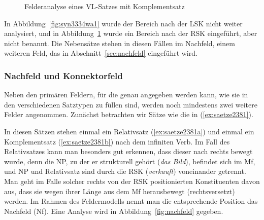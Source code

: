 \begin{figure}[!h]
  \centering
  \caption{Felderanalyse eines VL-Satzes mit Komplementsatz}
  \label{fig:syn3334wb2}
\end{figure}

In Abbildung~\ref{fig:syn3334wa1} wurde der Bereich nach der LSK nicht weiter analysiert, und in Abbildung~\ref{fig:syn3334wb2} wurde ein Bereich nach der RSK eingeführt, aber nicht benannt.
Die Nebensätze stehen in diesen Fällen im Nachfeld, einem weiteren Feld, das in Abschnitt~\ref{sec:nachfeld} eingeführt wird.

\subsubsection{Nachfeld und Konnektorfeld}

\label{sec:nebenfelder}
\label{sec:nachfeld}

Neben den primären Feldern, für die genau angegeben werden kann, wie sie in den verschiedenen Satztypen zu füllen sind, werden noch mindestens zwei weitere Felder angenommen.
Zunächst betrachten wir Sätze wie die in (\ref{ex:saetze2381}).

\begin{exe}
  \ex\label{ex:saetze2381}
  \begin{xlist}
  \end{xlist}
\end{exe}


In diesen Sätzen stehen einmal ein Relativsatz (\ref{ex:saetze2381a}) und einmal ein Komplementsatz (\ref{ex:saetze2381b}) nach dem infiniten Verb.
Im Fall des Relativsatzes kann man besonders gut erkennen, dass dieser nach rechts bewegt wurde, denn die NP, zu der er strukturell gehört (\textit{das Bild}), befindet sich im Mf, und NP und Relativsatz sind durch die RSK (\textit{verkauft}) voneinander getrennt.
Man geht im Falle solcher rechts von der RSK positionierten Konstituenten davon aus, dass sie wegen ihrer Länge aus dem Mf herausbewegt (rechtsversetzt) werden.
Im Rahmen des Feldermodells nennt man die entsprechende Position das Nachfeld (Nf).
Eine Analyse wird in Abbildung~\ref{fig:nachfeld} gegeben.


